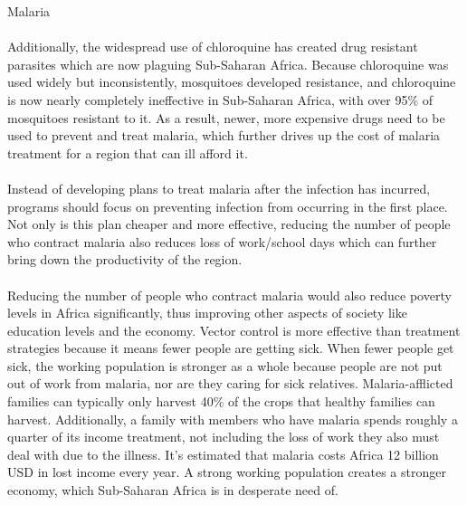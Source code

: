 \begin{mytcbox}{Malaria}
	\\
	\\	
	Additionally, the widespread use of chloroquine has created drug resistant parasites which are now plaguing Sub-Saharan Africa. Because chloroquine was used widely but inconsistently, mosquitoes developed resistance, and chloroquine is now nearly completely ineffective in Sub-Saharan Africa, with over 95\% of mosquitoes resistant to it. As a result, newer, more expensive drugs need to be used to prevent and treat malaria, which further drives up the cost of malaria treatment for a region that can ill afford it.
	\\
	\\
	Instead of developing plans to treat malaria after the infection has incurred, programs should focus on preventing infection from occurring in the first place. Not only is this plan cheaper and more effective, reducing the number of people who contract malaria also reduces loss of work/school days which can further bring down the productivity of the region.
	\\
	\\
	Reducing the number of people who contract malaria would also reduce poverty levels in Africa significantly, thus improving other aspects of society like education levels and the economy. Vector control is more effective than treatment strategies because it means fewer people are getting sick. When fewer people get sick, the working population is stronger as a whole because people are not put out of work from malaria, nor are they caring for sick relatives. Malaria-afflicted families can typically only harvest 40\% of the crops that healthy families can harvest. Additionally, a family with members who have malaria spends roughly a quarter of its income treatment, not including the loss of work they also must deal with due to the illness. It’s estimated that malaria costs Africa 12 billion USD in lost income every year. A strong working population creates a stronger economy, which Sub-Saharan Africa is in desperate need of.	
\end{mytcbox}